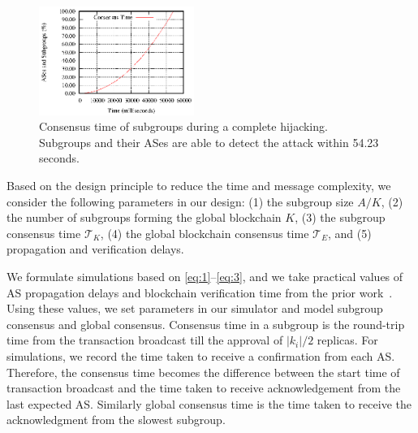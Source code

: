 \documentclass[5p]{elsarticle}
\begin{document}
\begin{figure}[t]
\begin{center}
\includegraphics[width=0.45\textwidth]{fig/completeHijackR2.eps}
\caption{Consensus time of subgroups during a complete hijacking. Subgroups and their ASes are able to detect the attack within 54.23 seconds.} 
\label{fig:simComplete}
\end{center}
\end{figure}



Based on the design principle to reduce the time and message complexity, we consider the following parameters in our design: (1) the subgroup size $A/K$, (2) the number of subgroups forming the global blockchain $K$, (3) the subgroup consensus time $\mathcal{T}_{K}$, (4) the global blockchain consensus time $\mathcal{T}_{E}$, and (5) propagation and verification delays. 




We formulate simulations based on \autoref{eq:1}--\autoref{eq:3}, and we take practical values of AS propagation delays and blockchain verification time from the prior work~\cite{LabovitzABJ01,TakahashiEII15,pazmino2015}. Using these values, we set parameters in our simulator and model subgroup consensus and global consensus. Consensus time in a subgroup is the round-trip time from the transaction broadcast till the approval of $|k_{i}|/2$ replicas. For simulations, we record the time taken to receive a confirmation from each AS. Therefore, the consensus time becomes the difference between the start time of transaction broadcast and the time taken to receive acknowledgement from the last expected AS. Similarly global consensus time is the time taken to receive the acknowledgment from the slowest subgroup. 

\end{document}
